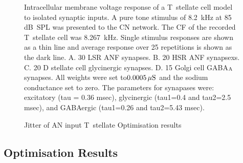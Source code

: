 \begin{figure}[htb]
  \centering
  \caption[Response of T~stellate cells to isolated synaptic
  inputs]{Intracellular membrane voltage response of a T~stellate cell model to isolated synaptic inputs. 
A pure tone stimulus of 8.2~kHz at 85 dB~SPL was presented to the CN network. The CF of the recorded T~stellate cell was 8.267~kHz.
Single stimulus responses are shown as a thin line and average response over 25 repetitions is shown as the dark line. 
A. 30 LSR ANF synapses. 
B. 20 HSR ANF synapsexs. 
C. 20 D stellate cell glycinergic synapses. 
D. 15 Golgi cell GABA$_{\rm A}$ synapses. 
All weights were set to$0.0005\,\mu{\rm S}$ and the sodium conductance set to zero.  
The parameters for synapases were: excitatory (tau = 0.36 msec), glycinergic (tau1=0.4 and tau2=2.5 msec), and GABAergic (tau1=0.26 and tau2=5.43 msec).\label{fig:TSinputs}}
\end{figure}

\begin{figure}[htb]
  \centering
  \caption[]{Jitter of AN input T~stellate Optimisation results}
  \label{fig:CSjitter}
\end{figure}




\clearpage
\subsection{Optimisation Results}

